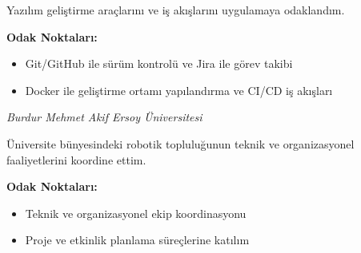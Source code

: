 Yazılım geliştirme araçlarını ve iş akışlarını uygulamaya odaklandım.

\vspace{0.2cm}
\noindent \textbf{Odak Noktaları:}
\begin{itemize}
    \item Git/GitHub ile sürüm kontrolü ve Jira ile görev takibi
    \item Docker ile geliştirme ortamı yapılandırma ve CI/CD iş akışları
\end{itemize}

\vspace{0.45cm}

\textit{Burdur Mehmet Akif Ersoy Üniversitesi}

Üniversite bünyesindeki robotik topluluğunun teknik ve organizasyonel faaliyetlerini koordine ettim.

\vspace{0.2cm}
\noindent \textbf{Odak Noktaları:}
\begin{itemize}
    \item Teknik ve organizasyonel ekip koordinasyonu
    \item Proje ve etkinlik planlama süreçlerine katılım
\end{itemize}
